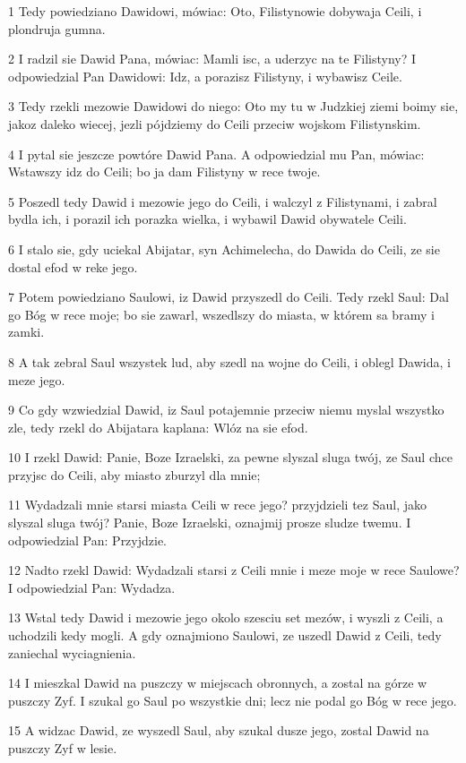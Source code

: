 \par 1 Tedy powiedziano Dawidowi, mówiac: Oto, Filistynowie dobywaja Ceili, i plondruja gumna.
\par 2 I radzil sie Dawid Pana, mówiac: Mamli isc, a uderzyc na te Filistyny? I odpowiedzial Pan Dawidowi: Idz, a porazisz Filistyny, i wybawisz Ceile.
\par 3 Tedy rzekli mezowie Dawidowi do niego: Oto my tu w Judzkiej ziemi boimy sie, jakoz daleko wiecej, jezli pójdziemy do Ceili przeciw wojskom Filistynskim.
\par 4 I pytal sie jeszcze powtóre Dawid Pana. A odpowiedzial mu Pan, mówiac: Wstawszy idz do Ceili; bo ja dam Filistyny w rece twoje.
\par 5 Poszedl tedy Dawid i mezowie jego do Ceili, i walczyl z Filistynami, i zabral bydla ich, i porazil ich porazka wielka, i wybawil Dawid obywatele Ceili.
\par 6 I stalo sie, gdy uciekal Abijatar, syn Achimelecha, do Dawida do Ceili, ze sie dostal efod w reke jego.
\par 7 Potem powiedziano Saulowi, iz Dawid przyszedl do Ceili. Tedy rzekl Saul: Dal go Bóg w rece moje; bo sie zawarl, wszedlszy do miasta, w którem sa bramy i zamki.
\par 8 A tak zebral Saul wszystek lud, aby szedl na wojne do Ceili, i oblegl Dawida, i meze jego.
\par 9 Co gdy wzwiedzial Dawid, iz Saul potajemnie przeciw niemu myslal wszystko zle, tedy rzekl do Abijatara kaplana: Wlóz na sie efod.
\par 10 I rzekl Dawid: Panie, Boze Izraelski, za pewne slyszal sluga twój, ze Saul chce przyjsc do Ceili, aby miasto zburzyl dla mnie;
\par 11 Wydadzali mnie starsi miasta Ceili w rece jego? przyjdzieli tez Saul, jako slyszal sluga twój? Panie, Boze Izraelski, oznajmij prosze sludze twemu. I odpowiedzial Pan: Przyjdzie.
\par 12 Nadto rzekl Dawid: Wydadzali starsi z Ceili mnie i meze moje w rece Saulowe? I odpowiedzial Pan: Wydadza.
\par 13 Wstal tedy Dawid i mezowie jego okolo szesciu set mezów, i wyszli z Ceili, a uchodzili kedy mogli. A gdy oznajmiono Saulowi, ze uszedl Dawid z Ceili, tedy zaniechal wyciagnienia.
\par 14 I mieszkal Dawid na puszczy w miejscach obronnych, a zostal na górze w puszczy Zyf. I szukal go Saul po wszystkie dni; lecz nie podal go Bóg w rece jego.
\par 15 A widzac Dawid, ze wyszedl Saul, aby szukal dusze jego, zostal Dawid na puszczy Zyf w lesie.
